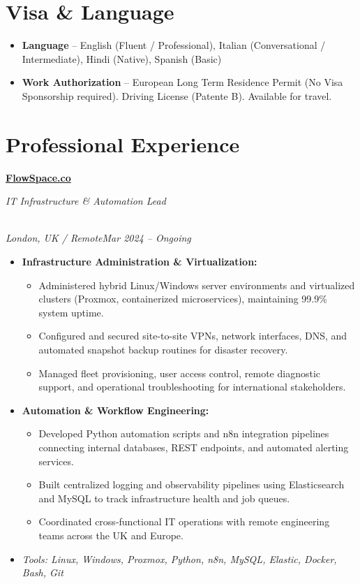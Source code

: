 \documentclass[a4paper,10pt]{article}
\newcommand{\role}[4]{\vspace{3pt}\noindent\hspace{0.6em}\parbox[t]{0.38\textwidth}{\raggedright\textbf{#1}}\hfill\parbox[t]{0.58\textwidth}{\raggedleft\textit{#2}}\\{\textit{#3}\hfill\textit{#4}}\vspace{1pt}}
\begin{document}
\section{Visa \& Language}
\begin{itemize}
\item \textbf{Language} -- English (Fluent / Professional), Italian (Conversational / Intermediate), Hindi (Native), Spanish (Basic)
\item \textbf{Work Authorization} -- European Long Term Residence Permit (No Visa Sponsorship required). Driving License (Patente B). Available for travel.
\end{itemize}

\section{Professional Experience}
\role{\href{https://flowspace.co}{FlowSpace.co}}{IT Infrastructure \& Automation Lead}{London, UK / Remote}{Mar 2024 -- Ongoing}
\begin{itemize}
\item \textbf{Infrastructure Administration \& Virtualization:}
\begin{itemize}[label=--]
\item Administered hybrid Linux/Windows server environments and virtualized clusters (Proxmox, containerized microservices), maintaining 99.9\% system uptime.
\item Configured and secured site-to-site VPNs, network interfaces, DNS, and automated snapshot backup routines for disaster recovery.
\item Managed fleet provisioning, user access control, remote diagnostic support, and operational troubleshooting for international stakeholders.
\end{itemize}
\item \textbf{Automation \& Workflow Engineering:}
\begin{itemize}[label=--]
\item Developed Python automation scripts and n8n integration pipelines connecting internal databases, REST endpoints, and automated alerting services.
\item Built centralized logging and observability pipelines using Elasticsearch and MySQL to track infrastructure health and job queues.
\item Coordinated cross-functional IT operations with remote engineering teams across the UK and Europe.
\end{itemize}
\item \textit{Tools: Linux, Windows, Proxmox, Python, n8n, MySQL, Elastic, Docker, Bash, Git}
\end{itemize}
\end{document}
